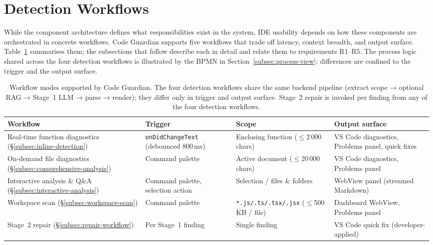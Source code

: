 \section{Detection Workflows}
\label{sec:detection-strategies}

While the component architecture defines what responsibilities exist in the system, IDE usability depends on how these components are orchestrated in concrete workflows. Code Guardian supports five workflows that trade off latency, context breadth, and output surface. Table~\ref{tab:concept-workflows-overview} summarises them; the subsections that follow describe each in detail and relate them to requirements R1--R5. The process logic shared across the four detection workflows is illustrated by the BPMN in Section~\ref{subsec:process-view}; differences are confined to the trigger and the output surface.

\begin{table}[H]
  \centering
  \caption[Workflow modes supported by Code Guardian.]{Workflow modes supported by Code Guardian. The four detection workflows share the same backend pipeline (extract scope → optional RAG → Stage~1 LLM → parse → render); they differ only in trigger and output surface. Stage~2 repair is invoked per finding from any of the four detection workflows.}
  \label{tab:concept-workflows-overview}
  \footnotesize
  \renewcommand{\arraystretch}{1.2}
  \begin{tabularx}{\textwidth}{p{}p{}p{}X}
    \toprule
    \textbf{Workflow} & \textbf{Trigger} & \textbf{Scope} & \textbf{Output surface} \\
    \midrule
    Real-time function diagnostics (\S\ref{subsec:inline-detection}) & \texttt{onDidChangeText} (debounced 800\,ms) & Enclosing function ($\leq$2\,000 chars) & VS Code diagnostics, Problems panel, quick fixes \\
    On-demand file diagnostics (\S\ref{subsec:comprehensive-analysis}) & Command palette & Active document ($\leq$20\,000 chars) & VS Code diagnostics, Problems panel \\
    Interactive analysis \& Q\&A (\S\ref{subsec:interactive-analysis}) & Command palette, selection action & Selection / files \& folders & WebView panel (streamed Markdown) \\
    Workspace scan (\S\ref{subsec:workspace-scan}) & Command palette & \texttt{*.js/.ts/.tsx/.jsx} ($\leq$500\,KB / file) & Dashboard WebView, Problems panel \\
    \midrule
    Stage~2 repair (\S\ref{subsec:repair-workflow}) & Per Stage~1 finding & Single finding & VS Code quick fix (developer-applied) \\
    \bottomrule
  \end{tabularx}
\end{table}


